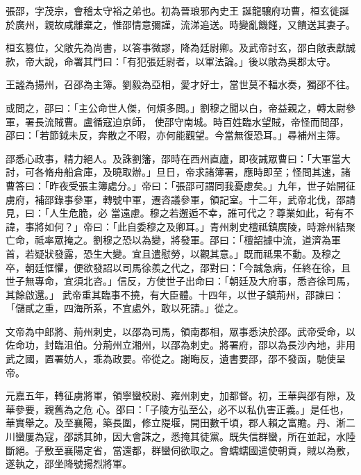 \begin{pinyinscope}
 張邵，字茂宗，會稽太守裕之弟也。初為晉琅邪內史王
 誕龍驤府功曹，桓玄徙誕於廣州，親故咸離棄之，惟邵情意彌謹，流涕追送。時變亂饑饉，又饋送其妻子。



 桓玄篡位，父敞先為尚書，以答事微謬，降為廷尉卿。及武帝討玄，邵白敞表獻誠款，帝大說，命署其門曰：「有犯張廷尉者，以軍法論。」後以敞為吳郡太守。



 王謐為揚州，召邵為主簿。劉毅為亞相，愛才好士，當世莫不輻水奏，獨邵不往。



 或問之，邵曰：「主公命世人傑，何煩多問。」劉穆之聞以白，帝益親之，轉太尉參軍，署長流賊曹。盧循寇迫京師，
 使邵守南城。時百姓臨水望賊，帝怪而問邵，邵曰：「若節鉞未反，奔散之不暇，亦何能觀望。今當無復恐耳。」尋補州主簿。



 邵悉心政事，精力絕人。及誅劉籓，邵時在西州直廬，即夜誡眾曹曰：「大軍當大討，可各脩舟船倉庫，及曉取辦。」旦日，帝求諸簿署，應時即至；怪問其速，諸曹答曰：「昨夜受張主簿處分。」帝曰：「張邵可謂同我憂慮矣。」九年，世子始開征虜府，補邵錄事參軍，轉號中軍，遷咨議參軍，領記室。十二年，武帝北伐，邵請見，曰：「人生危脆，必
 當遠慮。穆之若邂逅不幸，誰可代之？尊業如此，茍有不諱，事將如何？」帝曰：「此自委穆之及卿耳。」青州刺史檀祗鎮廣陵，時滁州結聚亡命，祗率眾掩之。劉穆之恐以為變，將發軍。邵曰：「檀韶據中流，道濟為軍首，若疑狀發露，恐生大變。宜且遣慰勞，以觀其意。」既而祗果不動。及穆之卒，朝廷恇懼，便欲發詔以司馬徐羨之代之，邵對曰：「今誠急病，任終在徐，且世子無專命，宜須北咨。」信反，方使世子出命曰：「朝廷及大府事，悉咨徐司馬，其餘啟還。」
 武帝重其臨事不撓，有大臣體。十四年，以世子鎮荊州，邵諫曰：「儲貳之重，四海所系，不宜處外，敢以死請。」從之。



 文帝為中郎將、荊州刺史，以邵為司馬，領南郡相，眾事悉決於邵。武帝受命，以佐命功，封臨沮伯。分荊州立湘州，以邵為刺史。將署府，邵以為長沙內地，非用武之國，置署妨人，乖為政要。帝從之。謝晦反，遺書要邵，邵不發函，馳使呈帝。



 元嘉五年，轉征虜將軍，領寧蠻校尉、雍州刺史，加都督。初，王華與邵有隙，及華參要，親舊為之危
 心。邵曰：「子陵方弘至公，必不以私仇害正義。」是任也，華實舉之。及至襄陽，築長圍，修立隄堰，開田數千頃，郡人賴之富贍。丹、淅二川蠻屢為寇，邵誘其帥，因大會誅之，悉掩其徒黨。既失信群蠻，所在並起，水陸斷絕。子敷至襄陽定省，當還都，群蠻伺欲取之。會蠕蠕國遣使朝貢，賊以為敷，遂執之，邵坐降號揚烈將軍。




\end{pinyinscope}

